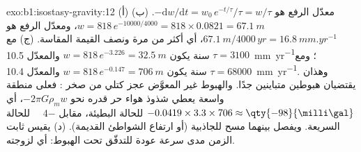 \begin{solution}{exo:b1:isostasy-gravity:12}
(أ) معدّل الرفع هو $-\mathrm dw/\mathrm dt = w_0\,e^{-t/\tau}/\tau = w/\tau$.
(ب) $w = 818\,e^{-10000/4000} = 818\times0.0821 = \qty{67.1}{m}$، ومعدّل الرفع هو $\qty{67.1}{m}/\num{4000}\,\unit{yr} = \qty{16.8}{mm.yr^{-1}}$، أي أكثر من مرة ونصف القيمة المقاسة. (ج) مع $\tau = 3100$ سنة يكون $w =
818\,e^{-3.226} = \qty{32.5}{m}$ والمعدّل \qty{10.5}{mm.yr^{-1}}؛ ومع $\tau = \num{68000}$ سنة يكون $w = 818\,e^{-0.147} = \qty{706}{m}$ والمعدّل \qty{10.4}{mm.yr^{-1}}. وهذان يقتضيان هبوطين متباينين جدًا. والهبوط غير المعوَّض عجز كتلي من صخر : فعلى منطقة واسعة يعطي شذوذ هواء حر قدره نحو $-2\pi G\rho_m w$، أي $-0.0419\times3.3\times706 \approx \qty{-98}{\milli\gal}$ للحالة البطيئة، مقابل \qty{-4}{\milli\gal} للحالة السريعة. ويفصل بينهما مسح للجاذبية (أو ارتفاع الشواطئ القديمة). (د) يقيس ثابت الزمن مدى سرعة عودة  للتدفّق تحت الهبوط: أي لزوجته.
\end{solution}

